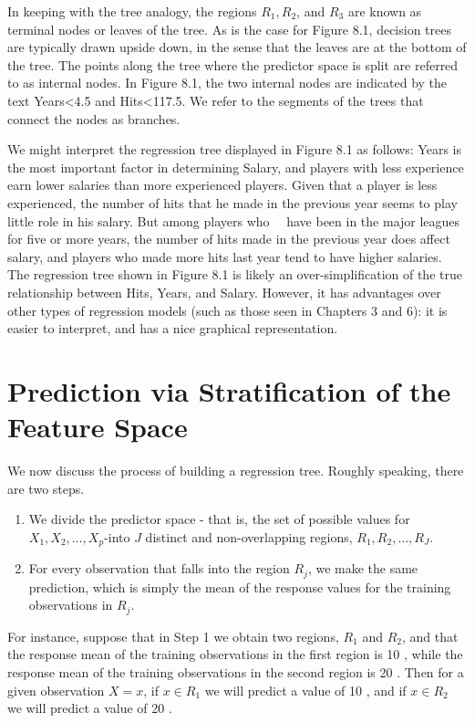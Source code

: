 \documentclass[10pt]{article}
\begin{document}
In keeping with the tree analogy, the regions $R_{1}, R_{2}$, and $R_{3}$ are known as terminal nodes or leaves of the tree. As is the case for Figure 8.1, decision trees are typically drawn upside down, in the sense that the leaves are at the bottom of the tree. The points along the tree where the predictor space is split are referred to as internal nodes. In Figure 8.1, the two internal nodes are indicated by the text Years<4.5 and Hits<117.5. We refer to the segments of the trees that connect the nodes as branches.

We might interpret the regression tree displayed in Figure 8.1 as follows: Years is the most important factor in determining Salary, and players with less experience earn lower salaries than more experienced players. Given that a player is less experienced, the number of hits that he made in the previous year seems to play little role in his salary. But among players who\
\
have been in the major leagues for five or more years, the number of hits made in the previous year does affect salary, and players who made more hits last year tend to have higher salaries. The regression tree shown in Figure 8.1 is likely an over-simplification of the true relationship between Hits, Years, and Salary. However, it has advantages over other types of regression models (such as those seen in Chapters 3 and 6): it is easier to interpret, and has a nice graphical representation.

\section*{Prediction via Stratification of the Feature Space}
We now discuss the process of building a regression tree. Roughly speaking, there are two steps.

\begin{enumerate}
  \item We divide the predictor space - that is, the set of possible values for $X_{1}, X_{2}, \ldots, X_{p}$-into $J$ distinct and non-overlapping regions, $R_{1}, R_{2}, \ldots, R_{J}$.
  \item For every observation that falls into the region $R_{j}$, we make the same prediction, which is simply the mean of the response values for the training observations in $R_{j}$.
\end{enumerate}

For instance, suppose that in Step 1 we obtain two regions, $R_{1}$ and $R_{2}$, and that the response mean of the training observations in the first region is 10 , while the response mean of the training observations in the second region is 20 . Then for a given observation $X=x$, if $x \in R_{1}$ we will predict a value of 10 , and if $x \in R_{2}$ we will predict a value of 20 .
\end{document}
